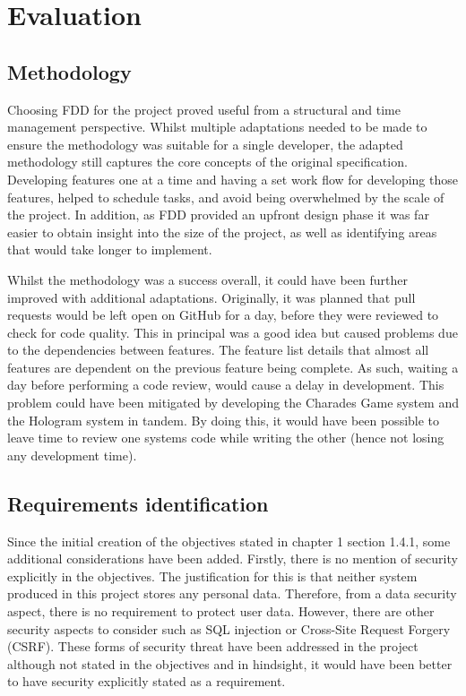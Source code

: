 \chapter{Evaluation}

\section{Methodology}
Choosing FDD for the project proved useful from a structural and time management perspective. Whilst multiple adaptations needed to be made to ensure the methodology was suitable for a single developer, the adapted methodology still captures the core concepts of the original specification. Developing features one at a time and having a set work flow for developing those features, helped to schedule tasks, and avoid being overwhelmed by the scale of the project. In addition, as FDD provided an upfront design phase it was far easier to obtain insight into the size of the project, as well as identifying areas that would take longer to implement.

Whilst the methodology was a success overall, it could have been further improved with additional adaptations. Originally, it was planned that pull requests would be left open on GitHub for a day, before they were reviewed to check for code quality. This in principal was a good idea but caused problems due to the dependencies between features. The feature list details that almost all features are dependent on the previous feature being complete. As such, waiting a day before performing a code review, would cause a delay in development. This problem could have been mitigated by developing the Charades Game system and the Hologram system in tandem. By doing this, it would have been possible to leave time to review one systems code while writing the other (hence not losing any development time).

\section{Requirements identification}

Since the initial creation of the objectives stated in chapter 1 section 1.4.1, some additional considerations have been added. Firstly, there is no mention of security explicitly in the objectives. The justification for this is that neither system produced in this project stores any personal data. Therefore, from a data security aspect, there is no requirement to protect user data. However, there are other security aspects to consider such as SQL injection or Cross-Site Request Forgery (CSRF). These forms of security threat have been addressed in the project although not stated in the objectives and in hindsight, it would have been better to have security explicitly stated as a requirement.

